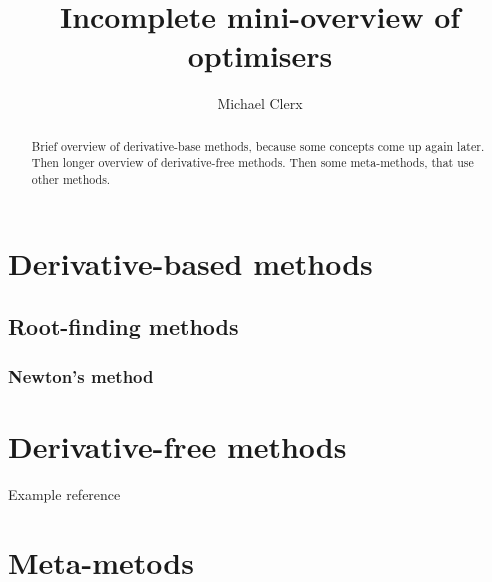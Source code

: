 \documentclass[10pt]{article}
\title{Incomplete mini-overview of optimisers}
\author{Michael Clerx}
\begin{document}
\addtolength{\abovedisplayskip}{-6pt}
\addtolength{\belowdisplayskip}{-6pt}
\maketitle

\begin{abstract}
Brief overview of derivative-base methods, because some concepts come up again later.
Then longer overview of derivative-free methods.
Then some meta-methods, that use other methods.
\end{abstract}

%
%
%
%
%
\section{Derivative-based methods}

\subsection{Root-finding methods}

\subsubsection{Newton's method}

%
%
%
%
\section{Derivative-free methods}

Example reference \citep{Nelder1965NelderMead}


%
%
%
%
\section{Meta-metods}



%
%
%
%


\end{document}
